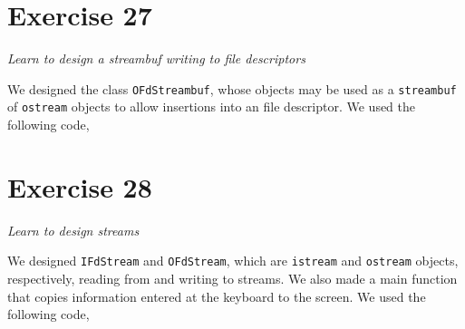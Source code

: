 \documentclass[12pt]{article}
\newcommand{\desc}[1]{\textit{#1} \vspace{1em}}
\begin{document}
\clearpage

\section*{Exercise 27}
\desc{Learn to design a streambuf writing to file descriptors}

We designed the class \texttt{OFdStreambuf}, whose objects may be used as a \texttt{streambuf} of \texttt{ostream} objects to allow insertions into an file descriptor. We used the following code,












\clearpage

\section*{Exercise 28}
\desc{Learn to design streams}

We designed \texttt{IFdStream} and \texttt{OFdStream}, which are \texttt{istream} and \texttt{ostream} objects, respectively, reading from and writing to streams. We also made a main function that copies information entered at the keyboard to the screen. We used the following code,










\end{document}
